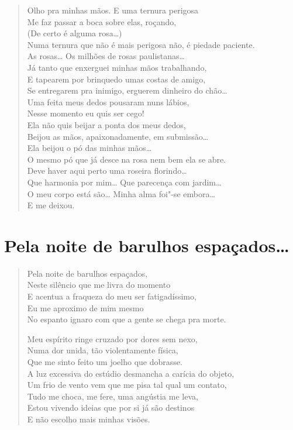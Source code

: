 {\begin{verse}
Olho pra minhas mãos. E uma ternura perigosa\\
Me faz passar a boca sobre elas, roçando,\\
(De certo é alguma rosa\ldots{})\\
Numa ternura que não é mais perigosa não, é piedade paciente.\\
As rosas\ldots{} Os milhões de rosas paulistanas\ldots{}\\
Já tanto que enxerguei minhas mãos trabalhando,\\
E tapearem por brinquedo umas costas de amigo,\\
Se entregarem pra inimigo, erguerem dinheiro do chão\ldots{}\\
Uma feita meus dedos pousaram nuns lábios,\\
Nesse momento eu quis ser cego!\\
Ela não quis beijar a ponta dos meus dedos,\\
Beijou as mãos, apaixonadamente, em submissão\ldots{}\\
Ela beijou o pó das minhas mãos\ldots{}\\
O mesmo pó que já desce na rosa nem bem ela se abre.\\
Deve haver aqui perto uma roseira florindo\ldots{}\\
Que harmonia por mim\ldots{} Que parecença com jardim\ldots{}\\
O meu corpo está são\ldots{} Minha alma foi"-se embora\ldots{}\\
E me deixou.
\end{verse}

\chapter[Pela noite de barulhos espaçados\ldots{}]{Pela noite de barulhos espaçados\ldots{} }

\begin{verse}
Pela noite de barulhos espaçados,\\
Neste silêncio que me livra do momento\\
E acentua a fraqueza do meu ser fatigadíssimo,\\
Eu me aproximo de mim mesmo\\
No espanto ignaro com que a gente se chega pra morte.

Meu espírito ringe cruzado por dores sem nexo,\\
Numa dor unida, tão violentamente física,\\
Que me sinto feito um joelho que dobrasse.\\
A luz excessiva do estúdio desmancha a carícia do objeto,\\
Um frio de vento vem que me pisa tal qual um contato,\\
Tudo me choca, me fere, uma angústia me leva,\\
Estou vivendo ideias que por si já são destinos\\
E não escolho mais minhas visões.


\end{verse}}
